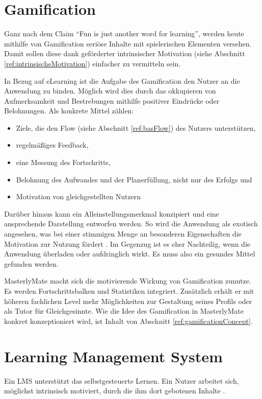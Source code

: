 \section{Gamification}\label{ref:gamification}
Ganz nach dem Claim "`Fun is just another word for learning"'\cite{koster:2005},
werden heute mithilfe von Gamification seriöse Inhalte mit spielerischen
Elementen versehen. Damit sollen diese dank geförderter intrinsischer
Motivation (siehe Abschnitt \ref{ref:intrinsischeMotivation}) einfacher zu
vermitteln sein.

In Bezug auf eLearning ist die Aufgabe des Gamification den Nutzer an die
Anwendung zu binden. Möglich wird dies durch das okkupieren von Aufmerksamkeit
und Bestrebungen mithilfe positiver Eindrücke oder Belohnungen. Als konkrete
Mittel zählen:
\begin{itemize}
  \item Ziele, die den Flow (siehe Abschnitt \ref{ref:basFlow}) des
Nutzers unterstützen,
	\item regelmäßiges Feedback,
	\item eine Messung des Fortschritts,
	\item Belohnung des Aufwandes und der Planerfüllung, nicht nur des Erfolgs und
	\item Motivation von gleichgestellten Nutzern
\end{itemize}
Darüber hinaus kann ein Alleinstellungsmerkmal konzipiert und eine ansprechende
Darstellung entworfen werden. So wird die Anwendung als exotisch angesehen, was
bei einer stimmigen Menge an besonderen Eigenschaften die Motivation zur Nutzung
fördert \cite{raymer:2011}. Im Gegenzug ist es eher Nachteilig, wenn die
Anwendung überladen oder aufdringlich wirkt. Es muss also ein gesundes Mittel
gefunden werden.

MasterlyMate macht sich die motivierende Wirkung von Gamification zunutze. Es
werden Fortschrittsbalken und Statistiken integriert. Zusätzlich erhält er mit
höheren fachlichen Level mehr Möglichkeiten zur Gestaltung seines Profils oder
als Tutor für Gleichgesinnte. Wie die Idee des Gamification in MasterlyMate
konkret konzeptioniert wird, ist Inhalt von Abschnitt
\ref{ref:gamificationConcept}.

\section{Learning Management System}
Ein LMS unterstützt das selbstgesteuerte Lernen. Ein Nutzer arbeitet sich,
möglichst intrinsisch motiviert, durch die ihm dort gebotenen Inhalte
\cite{wendt:2003}.

